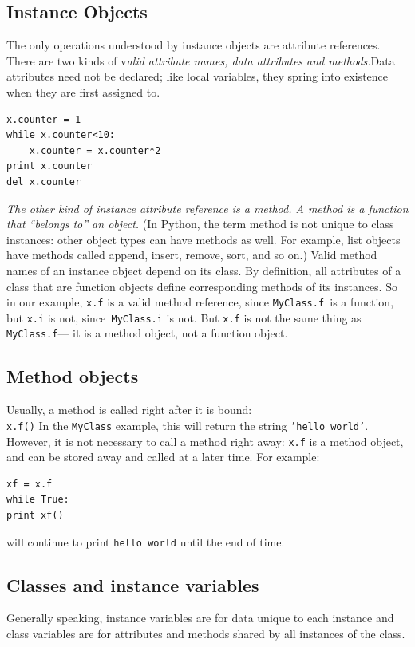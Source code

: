 \documentclass[12pt,a4paper]{article}
\begin{document}
\subsection{Instance Objects}
The only operations understood by instance objects are attribute references. There are two kinds of v\textit{alid attribute names, data attributes and methods.}Data attributes need not be declared; like local variables, they spring into existence when they are first assigned to.
\begin{verbatim}
x.counter = 1
while x.counter<10:
    x.counter = x.counter*2
print x.counter
del x.counter
\end{verbatim}
\textit{The other kind of instance attribute reference is a method. A method is a function that “belongs to” an object. }(In Python, the term method is not unique to class instances: other object types can have methods as well. For example, list objects have methods called append, insert, remove, sort, and so on.) Valid method names of an instance object depend on its class. By definition, all attributes of a class that are function objects define corresponding methods of its instances. So in our example, \texttt{x.f} is a valid method reference, since \texttt{MyClass.f }is a function, but \texttt{x.i} is not, since\texttt{ MyClass.i} is not. But \texttt{x.f} is not the same thing as \texttt{MyClass.f}— it is a method object, not a function object.
\subsection{Method objects}
Usually, a method is called right after it is bound:\\
\texttt{x.f()}
In the \texttt{MyClass} example, this will return the string \texttt{’hello world’}. However, it is not necessary to call a
method right away: \texttt{x.f} is a method object, and can be stored away and called at a later time. For example:
\begin{verbatim}
xf = x.f
while True:
print xf()
\end{verbatim}
will continue to print \texttt{hello world} until the end of time.
\subsection{Classes and instance variables}
Generally speaking, instance variables are for data unique to each instance and class variables are for attributes and methods shared by all instances of the class.
\end{document}
